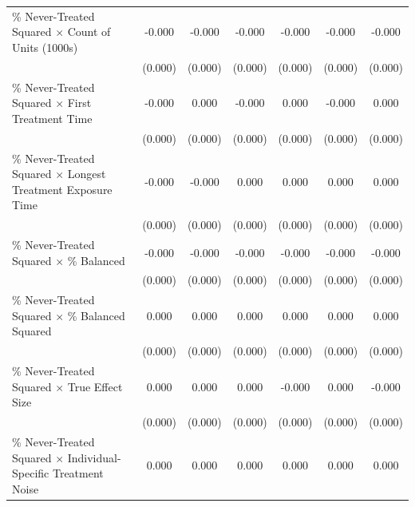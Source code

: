 \documentclass[12pt]{article}
\begin{document}
\begin{table}[htbp]
{\begin{tabular}{p{4.5in}|*{6}{c}}
\% Never-Treated Squared $\times$ Count of Units (1000s)&      -0.000\sym{***}&      -0.000\sym{**} &      -0.000\sym{**} &      -0.000\sym{*}  &      -0.000\sym{**} &      -0.000         \\
                    &     (0.000)         &     (0.000)         &     (0.000)         &     (0.000)         &     (0.000)         &     (0.000)         \\
\% Never-Treated Squared $\times$ First Treatment Time&      -0.000         &       0.000         &      -0.000\sym{***}&       0.000\sym{***}&      -0.000\sym{***}&       0.000\sym{***}\\
                    &     (0.000)         &     (0.000)         &     (0.000)         &     (0.000)         &     (0.000)         &     (0.000)         \\
\% Never-Treated Squared $\times$ Longest Treatment Exposure Time&      -0.000\sym{**} &      -0.000\sym{***}&       0.000\sym{***}&       0.000\sym{***}&       0.000\sym{***}&       0.000\sym{***}\\
                    &     (0.000)         &     (0.000)         &     (0.000)         &     (0.000)         &     (0.000)         &     (0.000)         \\
\% Never-Treated Squared $\times$ \% Balanced&      -0.000\sym{***}&      -0.000\sym{***}&      -0.000\sym{***}&      -0.000\sym{***}&      -0.000\sym{***}&      -0.000\sym{***}\\
                    &     (0.000)         &     (0.000)         &     (0.000)         &     (0.000)         &     (0.000)         &     (0.000)         \\
\% Never-Treated Squared $\times$ \% Balanced Squared&       0.000\sym{***}&       0.000\sym{***}&       0.000\sym{***}&       0.000\sym{***}&       0.000\sym{***}&       0.000\sym{***}\\
                    &     (0.000)         &     (0.000)         &     (0.000)         &     (0.000)         &     (0.000)         &     (0.000)         \\
\% Never-Treated Squared $\times$ True Effect Size&       0.000         &       0.000         &       0.000         &      -0.000         &       0.000         &      -0.000         \\
                    &     (0.000)         &     (0.000)         &     (0.000)         &     (0.000)         &     (0.000)         &     (0.000)         \\
\% Never-Treated Squared $\times$ Individual-Specific Treatment Noise&       0.000\sym{***}&       0.000\sym{***}&       0.000\sym{***}&       0.000\sym{**} &       0.000\sym{***}&       0.000\sym{**} \\

\end{tabular}}
\end{table}
\end{document}
